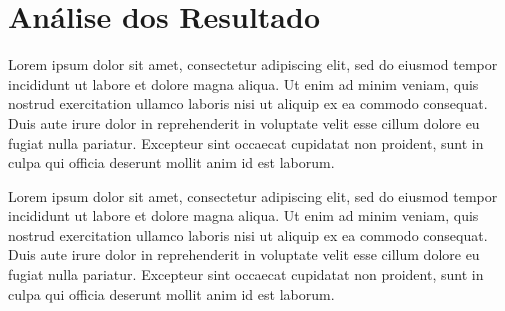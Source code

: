 \section{Análise dos Resultado}

	Lorem ipsum dolor sit amet, consectetur adipiscing elit, sed do 
	eiusmod tempor incididunt ut labore et dolore magna aliqua. Ut 
	enim ad minim veniam, quis nostrud exercitation ullamco laboris 
	nisi ut aliquip ex ea commodo consequat. Duis aute irure dolor in 
	reprehenderit in voluptate velit esse cillum dolore eu fugiat 
	nulla pariatur. Excepteur sint occaecat cupidatat non proident, 
	sunt in culpa qui officia deserunt mollit anim id est laborum.

	Lorem ipsum dolor sit amet, consectetur adipiscing elit, sed do 
	eiusmod tempor incididunt ut labore et dolore magna aliqua. Ut 
	enim ad minim veniam, quis nostrud exercitation ullamco laboris 
	nisi ut aliquip ex ea commodo consequat. Duis aute irure dolor in 
	reprehenderit in voluptate velit esse cillum dolore eu fugiat 
	nulla pariatur. Excepteur sint occaecat cupidatat non proident, 
	sunt in culpa qui officia deserunt mollit anim id est laborum.

